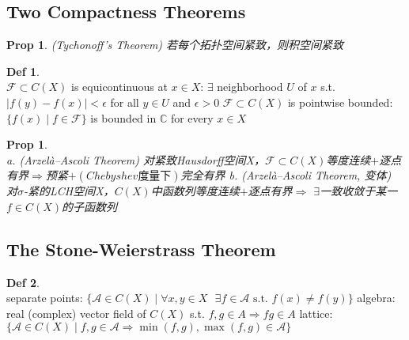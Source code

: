 \documentclass[hidelinks]{article}
\theoremstyle{definition}
\newtheorem*{defin}{Def}
\theoremstyle{plain}
\newtheorem{proposition}[theorem]{Prop}
\theoremstyle{remark}
\begin{document}
\subsection{Two Compactness Theorems}
\begin{proposition}(Tychonoff's Theorem)
若每个拓扑空间紧致，则积空间紧致
\end{proposition}

\begin{defin}~\\
$\mathscr{F}\subset C(X)$ is equicontinuous at $x\in X$: $\exists$ neighborhood $U$ of $x$ s.t. $|f(y)-f(x)|<\epsilon$ for all $y\in U$ and $\epsilon>0$ \newline
$\mathscr{F}\subset C(X)$ is pointwise bounded: $\{f(x)\mid f\in \mathscr{F}\}$ is bounded in $\mathbb{C}$ for every $x\in X$
\end{defin}

\begin{proposition}~\\
a. (Arzelà–Ascoli Theorem) 对紧致Hausdorff空间X，$\mathscr{F}\subset C(X)$等度连续$+$逐点有界$\Rightarrow$预紧$+$$(Chebyshev\textrm{度量下})$完全有界 \newline
b. (Arzelà–Ascoli Theorem, 变体) 对$\sigma$-紧的LCH空间X，$C(X)$中函数列等度连续$+$逐点有界$\Rightarrow$ $\exists$一致收敛于某一$f\in C(X)$的子函数列
\end{proposition}



\subsection{The Stone-Weierstrass Theorem}

\begin{defin}~\\
separate points: $\{\mathscr{A}\in C(X)\mid \forall x,y\in X \textrm{ } \exists f\in \mathscr{A} \textrm{ s.t. }f(x)\neq f(y)\}$ \newline
algebra: real (complex) vector field of $C(X)$ s.t. $f,g\in A\Rightarrow fg\in A$\newline
lattice: $\{\mathscr{A}\in C(X)\mid f,g\in \mathscr{A} \Rightarrow \min (f,g), \max(f,g) \in \mathscr{A}\}$
\end{defin}
\end{document}
